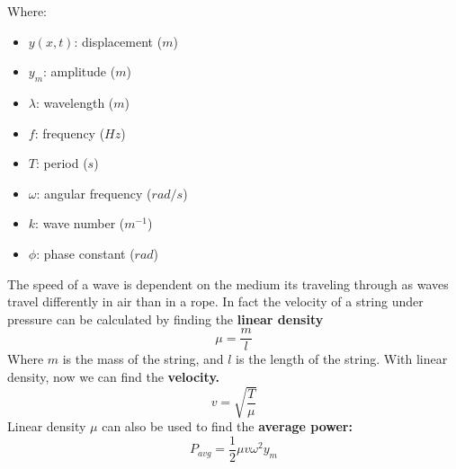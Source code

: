 \documentclass[11pt]{article}
\begin{document}
\hfill
\begin{minipage}[b]{0.5\textwidth}
    Where:
    \begin{itemize}
        \item $y(x,t)$: displacement ($m$)
        \item $y_m$: amplitude ($m$)
        \item $\lambda$: wavelength ($m$)
        \item $f$: frequency ($Hz$)
        \item $T$: period ($s$)
        \item $\omega$: angular frequency ($rad/s$)
        \item $k$: wave number ($m^{-1}$)
        \item $\phi$: phase constant ($rad$)
        \end{itemize}
\end{minipage}
\newline




 \noindent The speed of a wave is dependent on the medium its traveling through as waves travel differently in air than in a rope.
    In fact the velocity of a string under pressure can be calculated by
    finding the \textbf{linear density}
    \begin{equation}
        \mu = \frac{m}{l} \tag{linear density}
    \end{equation}
    Where $m$ is the mass of the string, and $l$ is the length of the string.
    With linear density, now we can find the \textbf{velocity.}
    \begin{equation}
        v = \sqrt {\frac{T}{\mu}} \tag{wave velocity}
    \end{equation}
    Linear density $\mu$ can also be used to find the \textbf{average power:}
    \begin{equation}
        P_{avg} = \frac{1}{2} \mu v \omega^2 y_m \tag{average power}
    \end{equation}
\end{document}

